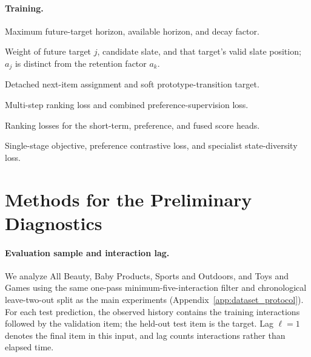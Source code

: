 ﻿\documentclass[sigconf,anonymous,review]{acmart}
\begin{document}
\paragraph{Training.}
\begin{description}[leftmargin=2.4cm,labelwidth=2.1cm,itemsep=0pt]
\item[$F,F',\eta$] Maximum future-target horizon, available horizon, and decay factor.
\item[$a_j,\mathcal S,p_j$] Weight of future target $j$, candidate slate, and that target's valid slate position; $a_j$ is distinct from the retention factor $a_k$.
\item[$q^+,y_{\mathrm{shift}}$] Detached next-item assignment and soft prototype-transition target.
\item[$\mathcal L_{\mathrm{rank}},\mathcal L_P$] Multi-step ranking loss and combined preference-supervision loss.
\item[$\mathcal L_S,\mathcal L_{\mathrm{pref}},\mathcal L_{\mathrm{fused}}$] Ranking losses for the short-term, preference, and fused score heads.
\item[$\mathcal L_{\mathrm{DL}},\mathcal L_{\mathrm{con}},\mathcal L_{\mathrm{div}}$] Single-stage objective, preference contrastive loss, and specialist state-diversity loss.
\end{description}

\section{Methods for the Preliminary Diagnostics}
\label{app:preliminary_diagnostics}

\paragraph{Evaluation sample and interaction lag.}
We analyze All Beauty, Baby Products, Sports and Outdoors, and Toys and Games using the same one-pass minimum-five-interaction filter and chronological leave-two-out split as the main experiments (Appendix~\ref{app:dataset_protocol}). For each test prediction, the observed history contains the training interactions followed by the validation item; the held-out test item is the target. Lag $\ell=1$ denotes the final item in this input, and lag counts interactions rather than elapsed time.
\end{document}
